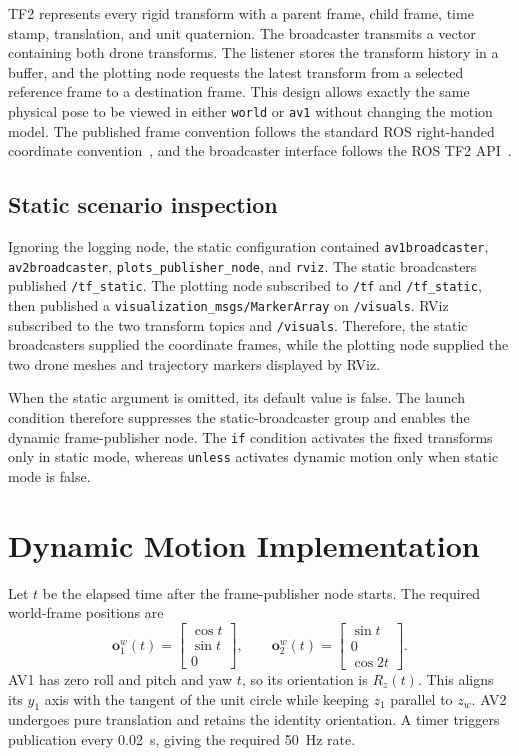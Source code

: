 \documentclass[11pt,a4paper]{article}
\newcommand{\vect}[1]{\bm{#1}}
\begin{document}
TF2 represents every rigid transform with a parent frame, child frame, time stamp, translation, and unit quaternion. The broadcaster transmits a vector containing both drone transforms. The listener stores the transform history in a buffer, and the plotting node requests the latest transform from a selected reference frame to a destination frame. This design allows exactly the same physical pose to be viewed in either \texttt{world} or \texttt{av1} without changing the motion model. The published frame convention follows the standard ROS right-handed coordinate convention~\cite{rep103}, and the broadcaster interface follows the ROS TF2 API~\cite{tf2api}.

\subsection{Static scenario inspection}

Ignoring the logging node, the static configuration contained \texttt{av1broadcaster}, \texttt{av2broadcaster}, \texttt{plots\_publisher\_node}, and \texttt{rviz}. The static broadcasters published \texttt{/tf\_static}. The plotting node subscribed to \texttt{/tf} and \texttt{/tf\_static}, then published a \texttt{visualization\_msgs/MarkerArray} on \texttt{/visuals}. RViz subscribed to the two transform topics and \texttt{/visuals}. Therefore, the static broadcasters supplied the coordinate frames, while the plotting node supplied the two drone meshes and trajectory markers displayed by RViz.

When the static argument is omitted, its default value is false. The launch condition therefore suppresses the static-broadcaster group and enables the dynamic frame-publisher node. The \texttt{if} condition activates the fixed transforms only in static mode, whereas \texttt{unless} activates dynamic motion only when static mode is false.

\section{Dynamic Motion Implementation}

Let $t$ be the elapsed time after the frame-publisher node starts. The required world-frame positions are
\begin{equation}
\vect{o}_1^w(t)=
\begin{bmatrix}\cos t\\ \sin t\\0\end{bmatrix},
\qquad
\vect{o}_2^w(t)=
\begin{bmatrix}\sin t\\0\\\cos 2t\end{bmatrix}.
\label{eq:world_positions}
\end{equation}
AV1 has zero roll and pitch and yaw $t$, so its orientation is $R_z(t)$. This aligns its $y_1$ axis with the tangent of the unit circle while keeping $z_1$ parallel to $z_w$. AV2 undergoes pure translation and retains the identity orientation. A timer triggers publication every 0.02~s, giving the required 50~Hz rate.
\end{document}
